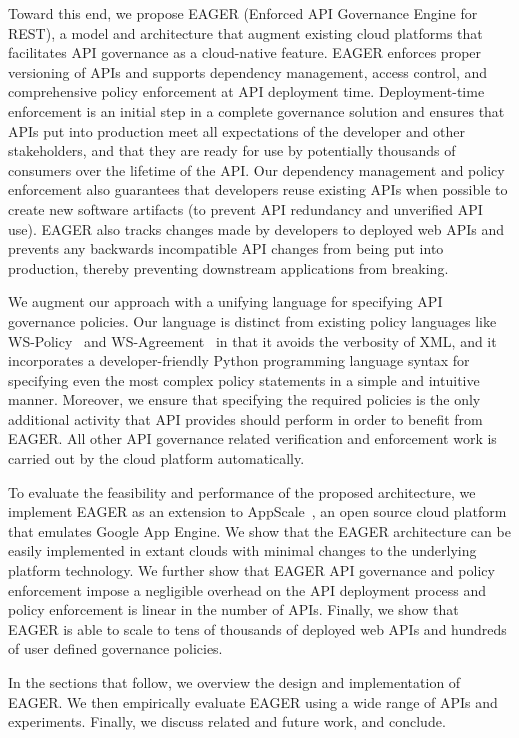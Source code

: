 Toward this end, we propose EAGER (Enforced API Governance Engine for REST), 
a model and architecture that augment existing
cloud platforms that facilitates API governance as a 
cloud-native feature. EAGER enforces proper versioning of APIs and supports dependency 
management, access control, and comprehensive policy enforcement at API deployment time. 
Deployment-time enforcement is an initial step in a complete governance
solution and ensures that APIs put into production meet all expectations of
the developer and other stakeholders, and that they are ready for use
by potentially thousands of consumers over the lifetime of the API.
Our dependency management and policy enforcement also guarantees that 
developers reuse existing APIs when possible to create new software artifacts
(to prevent API redundancy and unverified API use).
EAGER also tracks changes made by developers to deployed web APIs and prevents
any backwards incompatible API changes from being put into production, 
thereby preventing downstream applications from breaking.

We augment our approach with a unifying language for specifying 
API governance policies. Our language is distinct from 
existing policy languages like WS-Policy~\cite{WSPolicy,soagovstandard} and
WS-Agreement~\cite{WSAgreement} in that it avoids the verbosity of XML, 
and it incorporates a developer-friendly Python programming language syntax for 
specifying even the most complex policy statements in a simple and 
intuitive manner. Moreover, we ensure that specifying the required policies 
is the only additional activity that API provides should perform in
order to benefit from EAGER. All other API governance related verification and 
enforcement work is carried out by the cloud platform automatically.

To evaluate the feasibility and performance of the proposed 
architecture, we implement EAGER as an extension to AppScale~\cite{appscale13}, 
an open source
cloud platform that emulates Google App Engine. We show that the EAGER 
architecture can be easily implemented in extant clouds with
minimal changes to the underlying platform technology. We further show that 
EAGER API governance and policy enforcement impose a negligible 
overhead on the API deployment process and policy enforcement
is linear in the number of APIs.  Finally, we show that EAGER is able to
scale to tens of thousands of deployed web APIs and hundreds of user 
defined governance policies.

In the sections that follow, we overview the design and implementation of
EAGER. We then empirically evaluate EAGER using a wide range of APIs and
experiments.  Finally, we discuss related and future work, and conclude.


